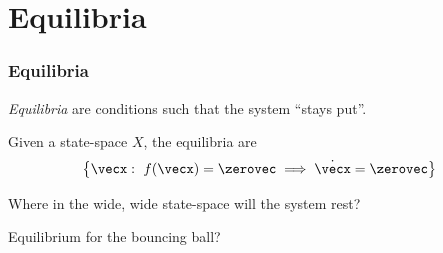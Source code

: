 \documentclass[12pt]{beamer}
\begin{document}
\section{Equilibria}


\begin{frame}
\frametitle{Equilibria}

\begin{itemize}

\vitem \emph{Equilibria} are conditions such that the system ``stays put''.

\vitem Given a state-space $X$, the equilibria are 
\[
\left\{
	\vecx : \ f(\vecx) = \zerovec \implies \dot \vecx = \zerovec
\right\}
\]

\vitem Where in the wide, wide state-space will the system rest?

\end{itemize}

\end{frame}



\begin{frame}
Equilibrium for the bouncing ball?
\end{frame}
\end{document}

